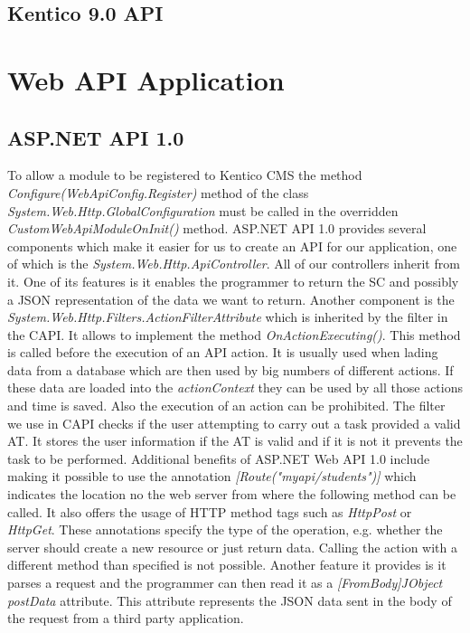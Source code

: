 \subsection{Kentico 9.0 API}

\section{Web API Application}
\subsection{ASP.NET API 1.0}
\label{API1.0} To allow a module to be registered to Kentico CMS the method \textit{Configure(WebApiConfig.Register)} method of the class \textit{System.Web.Http.GlobalConfiguration} must be called in the overridden \textit{CustomWebApiModuleOnInit()} method. ASP.NET API 1.0 provides several components which make it easier for us to create an API for our application, one of which is the \textit{System.Web.Http.ApiController}. All of our controllers inherit from it. One of its features is it enables the programmer to return the SC and possibly a JSON representation of the data we want to return. Another component is the \textit{System.Web.Http.Filters.ActionFilterAttribute} which is inherited by the filter in the CAPI. It allows to implement the method \textit{OnActionExecuting()}. This method is called before the execution of an API action. It is usually used when lading data from a database which are then used by big numbers of different actions. If these data are loaded into the \textit{actionContext} they can be used by all those actions and time is saved. Also the execution of an action can be prohibited. The filter we use in CAPI checks if the user attempting to carry out a task provided a valid AT. It stores the user information if the AT is valid and if it is not it prevents the task to be performed. Additional benefits of ASP.NET Web API 1.0 include making it possible to use the annotation \textit{[Route("myapi/students")]} which indicates the location no the web server from where the following method can be called. It also offers the usage of HTTP method tags such as \textit{HttpPost} or \textit{HttpGet}. These annotations specify the type of the operation, e.g. whether the server should create a new resource or just return data. Calling the action with a different method than specified is not possible. Another feature it provides is it parses a request and the programmer can then read it as a \textit{[FromBody]JObject postData} attribute. This attribute represents the JSON data sent in the body of the request from a third party application. 


